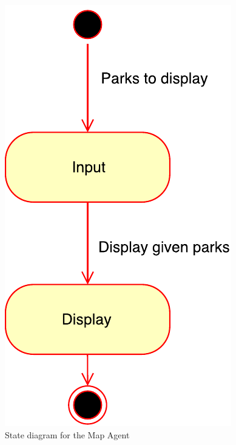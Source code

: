 \documentclass[titlepage,12pt]{article}
\begin{document}
\begin{figure}[H]
    \centering
    \begin{minipage}[b]{0.4\textwidth}
        \includegraphics[width=\textwidth]{state_diagrams/MapAgent}
        \caption{State diagram for the Map Agent}
        \label{fig:map_agent}
    \end{minipage}
    \hfill
    \begin{minipage}[b]{0.455\textwidth} %

\end{minipage}
\end{figure}
\end{document}
